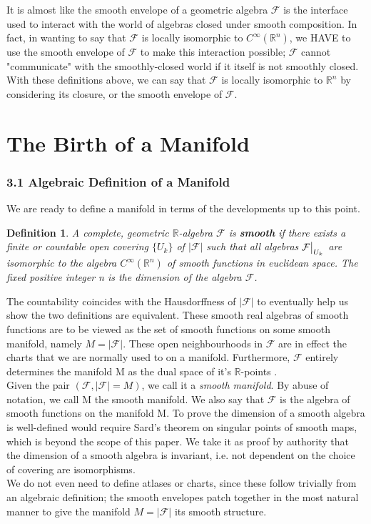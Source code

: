 \documentclass[12pt]{extarticle}
\newcommand\Reals{{\mathbb{R}}}
\newcommand{\ff}{\mathcal{F}}
\newcommand\restr[2]{{%
  \left.\kern-\nulldelimiterspace %
  #1 %
  \vphantom{\big|} %
  \right|_{#2} %
  }}
\newtheorem{definition}{Definition}
\begin{document}
It is almost like the smooth envelope of a geometric algebra $\ff$ is the interface used to interact with the world of algebras closed under smooth composition. In fact, in wanting to say that $\ff$ is locally isomorphic to $C^\infty(\Reals^n)$, we HAVE to use the smooth envelope of $\ff$ to make this interaction possible; $\ff$ cannot "communicate" with the smoothly-closed world if it itself is not smoothly closed. With these definitions above, we can say that $\ff$ is locally isomorphic to $\Reals^n$ by considering its closure, or the smooth envelope of $\ff$.

\part{The Birth of a Manifold}
\section*{3.1 Algebraic Definition of a Manifold}
We are ready to define a manifold in terms of the developments up to this point.
\begin{definition}
A complete, geometric $\Reals$-algebra $\ff$ is \textbf{smooth} if there exists a finite or countable open covering $\{U_k\}$ of $|\ff|$ such that all algebras $\restr{\ff}{U_k}$ are isomorphic to the algebra $C^\infty(\Reals^n)$ of smooth functions in euclidean space. The fixed positive integer n is the dimension of the algebra $\ff$.
\end{definition}
The countability coincides with the Hausdorffness of $|\ff|$ to eventually help us show the two definitions are equivalent. These smooth real algebras of smooth functions are to be viewed as the set of smooth functions on some smooth manifold, namely $M=|\ff|$. These open neighbourhoods in $\ff$ are in effect the charts that we are normally used to on a manifold. Furthermore, $\ff$ entirely determines the manifold M as the dual space of it's $\Reals$-points \cite{nestruev}.\\
Given the pair $(\ff, |\ff|=M)$, we call it a \textit{smooth manifold}. By abuse of notation, we call M the smooth manifold. We also say that $\ff$ is the algebra of smooth functions on the manifold M. To prove the dimension of a smooth algebra is well-defined would require Sard's theorem on singular points of smooth maps, which is beyond the scope of this paper. We take it as proof by authority that the dimension of a smooth algebra is invariant, i.e. not dependent on the choice of covering are isomorphisms.\\
We do not even need to define atlases or charts, since these follow trivially from an algebraic definition; the smooth envelopes patch together in the most natural manner to give the manifold $M=|\ff|$ its smooth structure.
\end{document}
